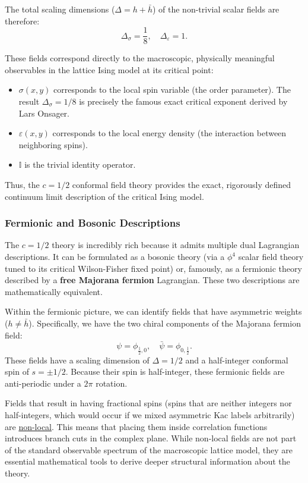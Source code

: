 The total scaling dimensions (\(\Delta = h + \bar{h}\)) of the non-trivial scalar fields are therefore:
\[
    \Delta_\sigma = \frac{1}{8}, \quad \Delta_\varepsilon = 1.
\]

These fields correspond directly to the macroscopic, physically meaningful observables in the lattice Ising model at its critical point:
\begin{itemize}
    \item \(\sigma(x, y)\) corresponds to the local spin variable (the order parameter). The result \(\Delta_\sigma = 1/8\) is precisely the famous exact critical exponent derived by Lars Onsager.
    \item \(\varepsilon(x, y)\) corresponds to the local energy density (the interaction between neighboring spins).
    \item \(\mathbb{I}\) is the trivial identity operator.
\end{itemize}
Thus, the \(c=1/2\) conformal field theory provides the exact, rigorously defined continuum limit description of the critical Ising model.

\subsubsection{Fermionic and Bosonic Descriptions}

The \(c=1/2\) theory is incredibly rich because it admits multiple dual Lagrangian descriptions. It can be formulated as a bosonic theory (via a \(\phi^4\) scalar field theory tuned to its critical Wilson-Fisher fixed point) or, famously, as a fermionic theory described by a \textbf{free Majorana fermion} Lagrangian. These two descriptions are mathematically equivalent.

Within the fermionic picture, we can identify fields that have asymmetric weights (\(h \neq \bar{h}\)). Specifically, we have the two chiral components of the Majorana fermion field:
\[
    \psi = \phi_{\frac{1}{2}, 0}, \quad \bar{\psi} = \phi_{0, \frac{1}{2}}.
\]
These fields have a scaling dimension of \(\Delta = 1/2\) and a half-integer conformal spin of \(s = \pm 1/2\). Because their spin is half-integer, these fermionic fields are anti-periodic under a \(2\pi\) rotation.

\begin{remark}
    Fields that result in having fractional spins (spins that are neither integers nor half-integers, which would occur if we mixed asymmetric Kac labels arbitrarily) are \uline{non-local}. This means that placing them inside correlation functions introduces branch cuts in the complex plane. While non-local fields are not part of the standard observable spectrum of the macroscopic lattice model, they are essential mathematical tools to derive deeper structural information about the theory.
\end{remark}

